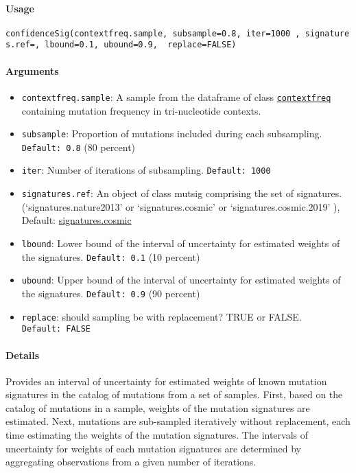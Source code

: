 \documentclass[]{article}
\providecommand{\tightlist}{%
  \setlength{\itemsep}{0pt}\setlength{\parskip}{0pt}}
\let\oldparagraph\paragraph
\renewcommand{\paragraph}[1]{\oldparagraph{#1}\mbox{}}
\begin{document}
\paragraph{\texorpdfstring{\textbf{Usage}}{Usage}}\label{usage-10}

\texttt{confidenceSig(contextfreq.sample,\ subsample=0.8,\ iter=1000\ ,\ signatures.ref=,\ lbound=0.1,\ ubound=0.9, \ replace=FALSE)}

\paragraph{\texorpdfstring{\textbf{Arguments
}}{Arguments }}\label{arguments-9}

\begin{itemize}
\tightlist
\item
  \texttt{contextfreq.sample}: A sample from the dataframe of class
  \protect\hyperlink{contextfreq}{\texttt{contextfreq}} containing
  mutation frequency in tri-nucleotide contexts.
\item
  \texttt{subsample}: Proportion of mutations included during each
  subsampling. \texttt{Default:\ 0.8} (80 percent)
\item
  \texttt{iter}: Number of iterations of subsampling.
  \texttt{Default:\ 1000}
\item
  \texttt{signatures.ref}: An object of class mutsig comprising the set of signatures. (`signatures.nature2013' or `signatures.cosmic' or `signatures.cosmic.2019' ), Default: \href{https://cran.r-project.org/web/packages/deconstructSigs/deconstructSigs.pdf}{signatures.cosmic} 
\item
  \texttt{lbound}: Lower bound of the interval of uncertainty for
  estimated weights of the signatures. \texttt{Default:\ 0.1} (10
  percent)
\item
  \texttt{ubound}: Upper bound of the interval of uncertainty for
  estimated weights of the signatures. \texttt{Default:\ 0.9} (90
  percent)
\item
  \texttt{replace}: should sampling be with replacement? TRUE or FALSE. \texttt{Default:\ FALSE} 
\end{itemize}

\paragraph{\texorpdfstring{\textbf{Details}}{Details}}\label{details-6}

Provides an interval of uncertainty for estimated weights of known
mutation signatures in the catalog of mutations from a set of samples.
First, based on the catalog of mutations in a sample, weights of the
mutation signatures are estimated. Next, mutations are sub-sampled
iteratively without replacement, each time estimating the weights of the
mutation signatures. The intervals of uncertainty for weights of each
mutation signatures are determined by aggregating observations from a
given number of iterations.
\end{document}
